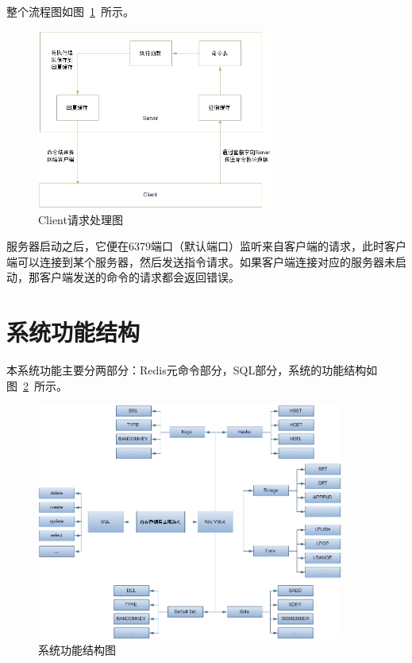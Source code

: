 \documentclass{zjutthesis}
\begin{document}
整个流程图如图~\ref{fig:Flow-Chart}~所示。
\begin{figure}[H]
\centering
\includegraphics[width=0.7\textwidth]{Flow-Chart}
\caption{Client请求处理图}\label{fig:Flow-Chart}
\vspace{\baselineskip} %
\end{figure}


服务器启动之后，它便在6379端口（默认端口）监听来自客户端的请求，此时客户端可以连接到某个服务器，然后发送指令请求。如果客户端连接对应的服务器未启动，那客户端发送的命令的请求都会返回错误。

\section{系统功能结构}
本系统功能主要分两部分：Redis元命令部分，SQL部分，系统的功能结构如图~\ref{fig:Command}~所示。
\begin{figure}[H]
\centering
\includegraphics[width=0.9\textwidth]{Command}
\caption{系统功能结构图}\label{fig:Command}
\vspace{\baselineskip} %
\end{figure}
\end{document}
